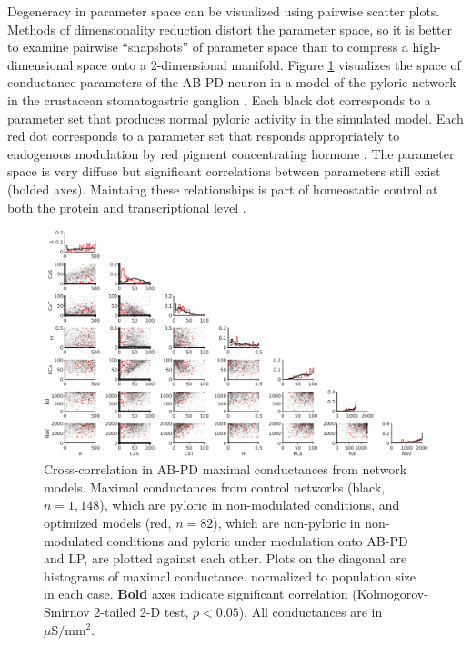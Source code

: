\documentclass[a4paper,10pt]{article} %
\begin{document}
Degeneracy in parameter space can be visualized using pairwise scatter plots.
Methods of dimensionality reduction distort the parameter space,
so it is better to examine pairwise ``snapshots'' of parameter space
than to compress a high-dimensional space onto a 2-dimensional manifold.
Figure \ref{fig:correlationsab} visualizes the space of conductance parameters
of the AB-PD neuron in a model of the pyloric network in the crustacean stomatogastric ganglion
\parencite{hoylandDifferentialResponsesNeuromodulation2018, prinzSimilarNetworkActivity2004}.
Each black dot corresponds to a parameter set that produces normal pyloric activity in the simulated model.
Each red dot corresponds to a parameter set that responds appropriately to endogenous modulation
by red pigment concentrating hormone
\parencite{swensenModulatorsConvergentCellular2001, nusbaumRolesCotransmissionNeural2001,
swensenMultiplePeptidesConverge2000}.
The parameter space is very diffuse but significant correlations between parameters still exist
(bolded axes).
Maintaing these relationships is part of homeostatic control at both the protein and transcriptional level
\parencite{schulzVariableChannelExpression2006a, olearyCorrelationsIonChannel2013,
marderNeuromodulationCircuitsVariable2014}.

\begin{figure}
	\centering
	\includegraphics[width=0.9\linewidth]{gfx/correlations_AB.eps}
	\caption{Cross-correlation in {AB}-{PD} maximal conductances from network models. Maximal conductances from control networks (black, $n=1,148$), which are pyloric in non-modulated conditions, and optimized models (red, $n=82$), which are non-pyloric in non-modulated conditions and pyloric under modulation onto {AB}-{PD} and {LP}, are plotted against each other. Plots on the diagonal are histograms of maximal conductance. normalized to population size in each case. \textbf{Bold} axes indicate significant correlation (Kolmogorov-Smirnov 2-tailed 2-D test, $p<0.05$). All conductances are in $\mu\mathrm{S/mm^2}.$}
	\label{fig:correlationsab}
\end{figure}
\end{document}
